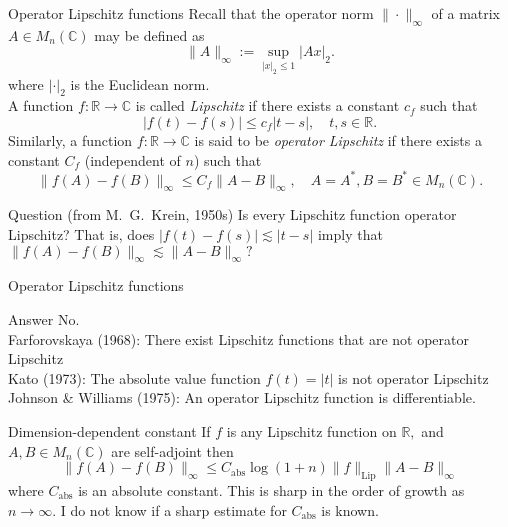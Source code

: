 \documentclass{beamer}
\numberwithin{equation}{section}
\theoremstyle{plain}
\theoremstyle{plain}
\theoremstyle{definition}
\theoremstyle{plain}
\theoremstyle{plain}
\theoremstyle{definition}
\newcommand{\Rl}{\mathbb{R}}
\newcommand{\Cplx}{\mathbb{C}}
\begin{document}
\begin{frame}{Operator Lipschitz functions}
    Recall that the operator norm $\|\cdot\|_{\infty}$ of a matrix $A \in M_n(\Cplx)$ may be defined as
    \[
        \|A\|_{\infty} := \sup_{|x|_2\leq 1} |Ax|_2.
    \]
    where $|\cdot|_2$ is the Euclidean norm.\\
    \pause
    A function $f:\Rl\to \Cplx$ is called \emph{Lipschitz} if there exists a constant $c_f$ such that
    \[
        |f(t)-f(s)|\leq c_f|t-s|,\quad t,s\in \Rl.
    \]\pause
    Similarly, a function $f:\Rl\to \Cplx$ is said to be \emph{operator Lipschitz} if there exists a constant $C_f$ (independent of $n$) such that
    \begin{equation*}
        \|f(A)-f(B)\|_\infty \leq C_f\|A-B\|_\infty,\quad A=A^*,B=B^* \in M_n(\Cplx).
    \end{equation*}
    \pause
    \begin{block}{Question (from M.~G.~Krein, 1950s)}
        Is every Lipschitz function operator Lipschitz?
        \pause
        That is, does $|f(t)-f(s)|\lesssim |t-s|$ imply that $\|f(A)-f(B)\|_{\infty} \lesssim \|A-B\|_{\infty}?$
    \end{block}
\end{frame}

\begin{frame}{Operator Lipschitz functions}
    \begin{block}{Answer}
        No.\\\pause
        Farforovskaya (1968): There exist Lipschitz functions that are not operator Lipschitz\\\pause
        Kato (1973): The absolute value function $f(t) = |t|$ is not operator Lipschitz\\\pause
        Johnson \& Williams (1975): An operator Lipschitz function is differentiable.
    \end{block}
\end{frame}

\begin{frame}{Dimension-dependent constant}
    If $f$ is any Lipschitz function on $\Rl,$ and $A,B \in M_n(\Cplx)$ are self-adjoint then
    \[
        \|f(A)-f(B)\|_{\infty} \leq C_{\mathrm{abs}}\log(1+n)\|f\|_{\mathrm{Lip}}\|A-B\|_{\infty}
    \]
    where $C_{\mathrm{abs}}$ is an absolute constant. This is sharp in the order of growth as $n\to\infty.$ I do not know if a sharp estimate for $C_{\mathrm{abs}}$ is known.
\end{frame}
\end{document}
